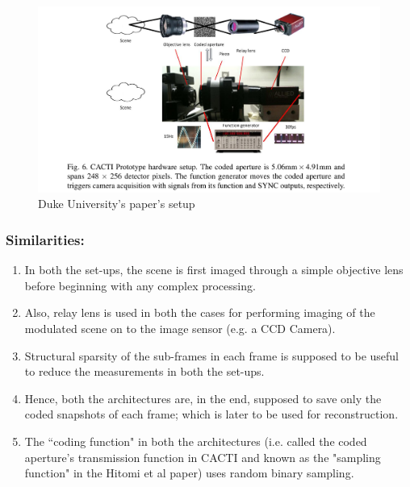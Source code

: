 \documentclass[fleqn, 11pt]{article}
\begin{document}
\medskip 

\begin{figure}[h!]
       \includegraphics[scale=0.25]{duke.png}
       \caption{Duke University's paper's setup}
       \label{fig:duke}
\end{figure}


\subsubsection*{Similarities:}
\begin{enumerate}
    \item In both the set-ups, the scene is first imaged through a simple 
    objective lens before beginning with any complex processing. 
    \item Also, relay lens is used in both the cases for performing imaging of the 
    modulated scene on to the image sensor (e.g. a CCD Camera). 
    \item Structural sparsity of the sub-frames in each frame is supposed to be
    useful to reduce the measurements in both the set-ups.
    \item Hence, both the architectures are, in the end, supposed to save only the coded snapshots
    of each frame; which is later to be used for reconstruction. 
    \item The ``coding function" in both the architectures (i.e. called the coded aperture’s 
    transmission function in CACTI and known as the "sampling function" in the Hitomi et al 
    paper) uses random binary sampling.
    
\end{enumerate}
\end{document}
